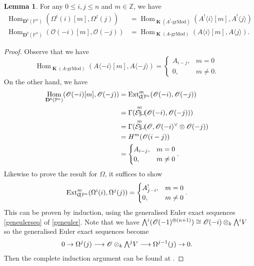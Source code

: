 \documentclass[a4paper]{article}
\theoremstyle{definition}
\newtheorem{lemma}[defn]{Lemma}
\theoremstyle{remark}
\newcommand{\Exter}{\mathchoice{{\textstyle\bigwedge}}%
    {{\bigwedge}}%
    {{\textstyle\wedge}}%
    {{\scriptstyle\wedge}}}
\newcommand{\grMod}{\ensuremath{\text{-grMod}}}
\DeclareMathOperator{\Hom}{\text{Hom}}
\DeclareMathOperator{\Extsh}{\mathcal{E\kern -1pt x\kern -2pt t\kern -1pt}}
\DeclareMathOperator{\kom}{{\mathbf{K}}}
\newcommand{\deri}{\mathbf{D}}
\newcommand{\Pn}{\ensuremath{{\mathbb{P}^n}}}
\DeclareMathOperator{\coh}{\mathcal{C\kern -2pt o\kern -2pt h\kern -1pt}}
\begin{document}
\begin{lemma}\label{beilinson-lemma2}
    For any \(0\leq i,j \leq n\) and \(m\in \mathbb{Z}\), we have 
    \begin{align*} 
        \Hom_{\deri^b(\Pn)}(\Omega^i(i)[m],\Omega^j(j)) &=
        \Hom_{\kom(A^!\grMod)}(A^!\langle i \rangle[m], A^!\langle j \rangle)  \\
        \Hom_{\deri^b(\Pn)}(\mathscr{O}(-i)[m],\mathscr{O}(-j)) &=
        \Hom_{\kom(A\grMod)}(A\langle i \rangle[m], A\langle j \rangle)  .
    \end{align*}
    \begin{proof}
        Observe that we have 
        \[\Hom_{\kom(A\grMod)}(A\langle -i \rangle [m], A\langle -j \rangle )=
            \begin{cases} A_{i-j}, & m=0 \\ 0, &m\neq 0.  \end{cases}\]
        On the other hand, we have
         \begin{align*}
             \Hom_{\deri^b(\Pn)}(\mathscr{O}(-i)[m],\mathscr{O}(-j)) 
             &= \text{Ext}^m_{\coh\Pn}(\mathscr{O}(-i),\mathscr{O}(-j)) \\ 
             &= \Gamma(\Extsh^m(\mathscr{O}(-i), \mathscr{O}(-j))) \\ 
             &= \Gamma(\Extsh^m(\mathscr{O},\mathscr{O}(-i)^\vee\otimes \mathscr{O}(-j)) \\ 
             &= H^m(\mathscr{O}(i-j)) \\ 
             &= \begin{cases}
                 A_{i-j}, &m=0 \\ 
                 0, &m\neq 0
             \end{cases}.
         \end{align*}
         Likewise to prove the result for \(\Omega\), it suffices to show
         \[
             \text{Ext}_{\coh\Pn}^m(\Omega^i(i), \Omega^j(j))= \begin{cases}
             A^!_{j-i}, &m=0 \\ 0, &m\neq 0 \end{cases}.\label{starstar}
         \]
         This can be proven by induction, using the
         generalised Euler exact sequences \eqref{geneulerseq} of
         \cref{geneuler}.  Note that we have
         \(\Exter^i(\mathscr{O}(-1)^{\oplus(n+1)})\cong \mathscr{O}(-i)\otimes_k
         \Exter^i V\) so the generalised Euler exact sequences become
         \[0\rightarrow \Omega^j(j) \longrightarrow
         \mathscr{O}\otimes_k \Exter^jV \longrightarrow
         \Omega^{j-1}(j)\rightarrow 0.\]
         Then the complete induction argument can be found at
         .
    \end{proof}
\end{lemma}
\end{document}
